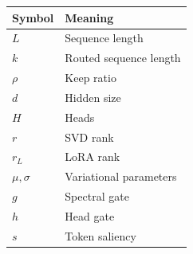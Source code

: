 \begin{table}[H]
\centering
\small
\begin{tabular}{ll}
\toprule
\textbf{Symbol} & \textbf{Meaning} \\
\midrule
$L$ & Sequence length \\
$k$ & Routed sequence length \\
$\rho$ & Keep ratio \\
$d$ & Hidden size \\
$H$ & Heads \\
$r$ & SVD rank \\
$r_L$ & LoRA rank \\
$\mu, \sigma$ & Variational parameters \\
$g$ & Spectral gate \\
$h$ & Head gate \\
$s$ & Token saliency \\
\bottomrule
\end{tabular}
\end{table}

